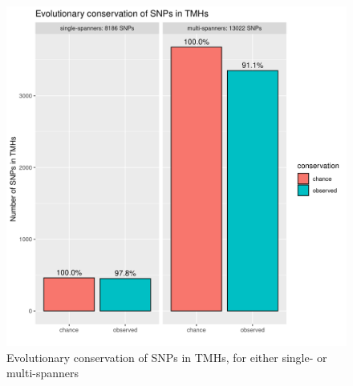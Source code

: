 \begin{figure}[!htbp]
  \includegraphics[width=\textwidth]{ncbi_peregrine_results/fig_conservation_per_spanner.png}
  \caption{
    Evolutionary conservation of SNPs in TMHs,
    for either single- or multi-spanners
  }
  \label{fig:conservation_per_spanner}
\end{figure}

